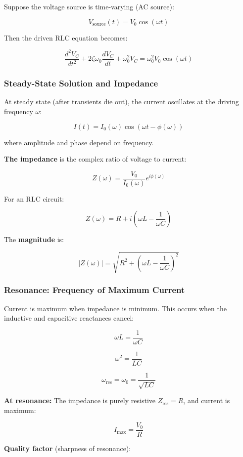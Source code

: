 \documentclass[
]{article}
\begin{document}
Suppose the voltage source is time-varying (AC source):

\[V_{\text{source}}(t) = V_0 \cos(\omega t)\]

Then the driven RLC equation becomes:

\[\frac{d^2V_C}{dt^2} + 2\zeta\omega_0\frac{dV_C}{dt} + \omega_0^2 V_C = \omega_0^2 V_0 \cos(\omega t)\]

\subsubsection{Steady-State Solution and
Impedance}\label{steady-state-solution-and-impedance}

At steady state (after transients die out), the current oscillates at
the driving frequency \(\omega\):

\[I(t) = I_0(\omega)\cos(\omega t - \phi(\omega))\]

where amplitude and phase depend on frequency.

\textbf{The impedance} is the complex ratio of voltage to current:

\[Z(\omega) = \frac{V_0}{I_0(\omega)} e^{i\phi(\omega)}\]

For an RLC circuit:

\[Z(\omega) = R + i\left(\omega L - \frac{1}{\omega C}\right)\]

The \textbf{magnitude} is:

\[|Z(\omega)| = \sqrt{R^2 + \left(\omega L - \frac{1}{\omega C}\right)^2}\]

\subsubsection{Resonance: Frequency of Maximum
Current}\label{resonance-frequency-of-maximum-current}

Current is maximum when impedance is minimum. This occurs when the
inductive and capacitive reactances cancel:

\[\omega L = \frac{1}{\omega C}\]

\[\omega^2 = \frac{1}{LC}\]

\[\boxed{\omega_{\text{res}} = \omega_0 = \frac{1}{\sqrt{LC}}}\]

\textbf{At resonance:} The impedance is purely resistive
\(Z_{\text{res}} = R\), and current is maximum:

\[I_{\text{max}} = \frac{V_0}{R}\]

\textbf{Quality factor} (sharpness of resonance):
\end{document}
